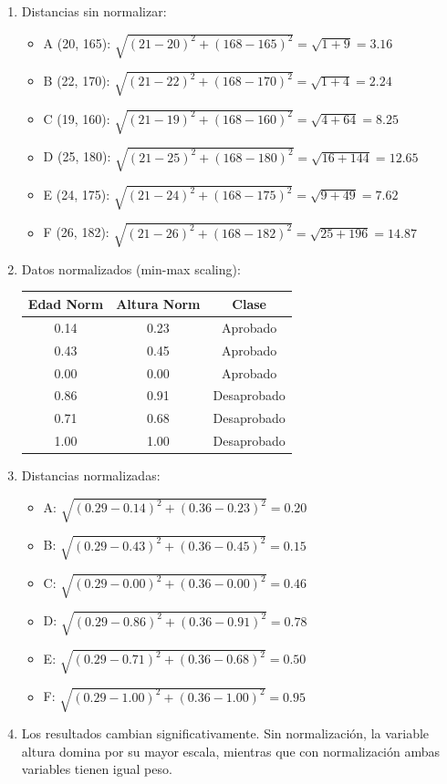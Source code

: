 \documentclass[12pt]{article}
\begin{document}
\begin{enumerate}
    \item Distancias sin normalizar:
    \begin{itemize}
        \item A (20, 165): $\sqrt{(21-20)^2 + (168-165)^2} = \sqrt{1 + 9} = 3.16$
        \item B (22, 170): $\sqrt{(21-22)^2 + (168-170)^2} = \sqrt{1 + 4} = 2.24$
        \item C (19, 160): $\sqrt{(21-19)^2 + (168-160)^2} = \sqrt{4 + 64} = 8.25$
        \item D (25, 180): $\sqrt{(21-25)^2 + (168-180)^2} = \sqrt{16 + 144} = 12.65$
        \item E (24, 175): $\sqrt{(21-24)^2 + (168-175)^2} = \sqrt{9 + 49} = 7.62$
        \item F (26, 182): $\sqrt{(21-26)^2 + (168-182)^2} = \sqrt{25 + 196} = 14.87$
    \end{itemize}
    
    \item Datos normalizados (min-max scaling):
    \begin{table}[H]
        \centering
        \begin{tabular}{ccc}
            \toprule
            \textbf{Edad Norm} & \textbf{Altura Norm} & \textbf{Clase} \\
            \midrule
            0.14 & 0.23 & Aprobado \\
            0.43 & 0.45 & Aprobado \\
            0.00 & 0.00 & Aprobado \\
            0.86 & 0.91 & Desaprobado \\
            0.71 & 0.68 & Desaprobado \\
            1.00 & 1.00 & Desaprobado \\
            \bottomrule
        \end{tabular}
    \end{table}
    
    \item Distancias normalizadas:
    \begin{itemize}
        \item A: $\sqrt{(0.29-0.14)^2 + (0.36-0.23)^2} = 0.20$
        \item B: $\sqrt{(0.29-0.43)^2 + (0.36-0.45)^2} = 0.15$
        \item C: $\sqrt{(0.29-0.00)^2 + (0.36-0.00)^2} = 0.46$
        \item D: $\sqrt{(0.29-0.86)^2 + (0.36-0.91)^2} = 0.78$
        \item E: $\sqrt{(0.29-0.71)^2 + (0.36-0.68)^2} = 0.50$
        \item F: $\sqrt{(0.29-1.00)^2 + (0.36-1.00)^2} = 0.95$
    \end{itemize}
    
    \item Los resultados cambian significativamente. Sin normalización, la variable altura domina por su mayor escala, mientras que con normalización ambas variables tienen igual peso.
\end{enumerate}
\end{document}
